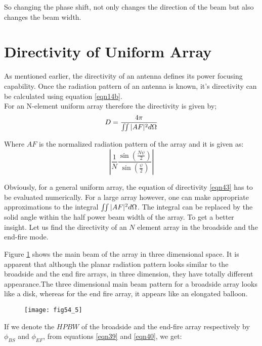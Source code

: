 So changing the phase shift, not only changes the direction of the beam but also changes the beam width. 


\section{Directivity of Uniform Array}

As mentioned earlier, the directivity of an antenna defines its power focusing capability. Once the radiation pattern of an antenna is known, it's directivity can be calculated using equation \ref{eqn14b}.\\

For an N-element uniform array therefore the directivity is given by;
\begin{equation}
D = \frac{4 \pi}{\iint \arrowvert AF \arrowvert^2 d \Omega}
\label{eqn43}
\end{equation}


Where $AF$ is the normalized radiation pattern of the array and it is given as:
$$
\left\vert \frac{1}{N} \frac{\sin{(\frac{N \psi}{2})}}{\sin{(\frac{ \psi}{2})}} \right\vert
$$

Obviously, for a general uniform array, the equation of directivity \ref{eqn43} has to be evaluated numerically. For a large array however, one can make appropriate approximations to the integral $\iint \arrowvert AF \arrowvert^2 d \Omega$. The integral can be replaced by the solid angle within the half power beam width of the array. To get a better insight. Let us find the directivity of an $N$ element array in the broadside and the end-fire mode.

Figure \ref{54.8} shows the main beam of the array in three dimensional space. It is apparent that although the planar radiation pattern looks similar to the broadside and the end fire arrays, in three dimension, they have totally different appearance.The three dimensional main beam pattern for a broadside array looks like a disk, whereas for the end fire array, it appears like an elongated balloon.

\begin{figure}[h!]
	\texttt{[image: fig54\_5]}
	\centering
	\caption{}
	
	\label{54.8}
	
\end{figure}

If we denote the $HPBW$ of the broadside and the end-fire array respectively by $\phi_{BS}$ and $\phi_{EF}$, from equations \ref{eqn39} and \ref{eqn40}, we get:

